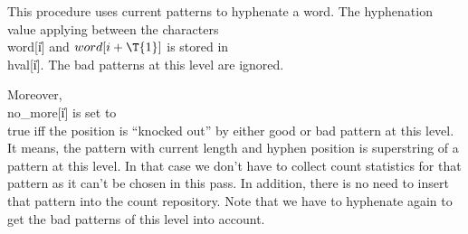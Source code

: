 This procedure uses current patterns to hyphenate a word. The
hyphenation value applying between the characters \\{word}[\|i] and
$\\{word}[\|i+\T{1}]$ is stored in \\{hval}[\|i]. The bad patterns at this
level are
ignored.

Moreover, \\{no\_more}[\|i] is set to \\{true} iff the position is ``knocked
out'' by either good or bad pattern at this level. It means, the pattern
with current length and hyphen position is superstring of a pattern at
this level. In that case we don't have to collect count statistics for
that pattern as it can't be chosen in this pass. In addition, there is no
need to insert that pattern into the count repository. Note that we have
to hyphenate again to get the bad patterns of this level into account.

